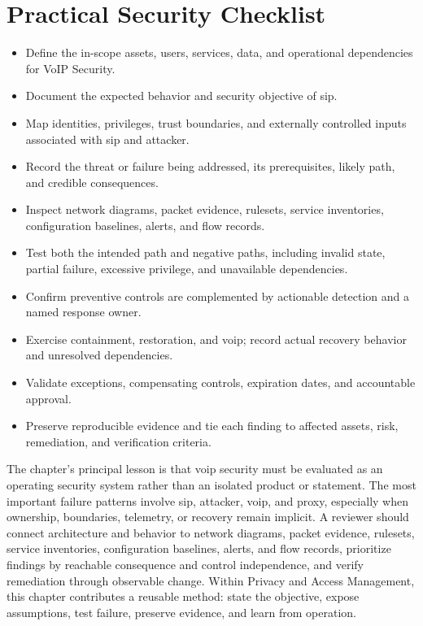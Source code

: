 \documentclass[11pt]{article}
\begin{document}
\section*{Practical Security Checklist}
\begin{itemize}[label=$\square$]
\item Define the in-scope assets, users, services, data, and operational dependencies for VoIP Security.
\item Document the expected behavior and security objective of sip.
\item Map identities, privileges, trust boundaries, and externally controlled inputs associated with sip and attacker.
\item Record the threat or failure being addressed, its prerequisites, likely path, and credible consequences.
\item Inspect network diagrams, packet evidence, rulesets, service inventories, configuration baselines, alerts, and flow records.
\item Test both the intended path and negative paths, including invalid state, partial failure, excessive privilege, and unavailable dependencies.
\item Confirm preventive controls are complemented by actionable detection and a named response owner.
\item Exercise containment, restoration, and voip; record actual recovery behavior and unresolved dependencies.
\item Validate exceptions, compensating controls, expiration dates, and accountable approval.
\item Preserve reproducible evidence and tie each finding to affected assets, risk, remediation, and verification criteria.
\end{itemize}
\begin{synthesisbox}
The chapter's principal lesson is that voip security must be evaluated as an operating security system rather than an isolated product or statement. The most important failure patterns involve sip, attacker, voip, and proxy, especially when ownership, boundaries, telemetry, or recovery remain implicit. A reviewer should connect architecture and behavior to network diagrams, packet evidence, rulesets, service inventories, configuration baselines, alerts, and flow records, prioritize findings by reachable consequence and control independence, and verify remediation through observable change. Within Privacy and Access Management, this chapter contributes a reusable method: state the objective, expose assumptions, test failure, preserve evidence, and learn from operation.
\end{synthesisbox}
\end{document}
